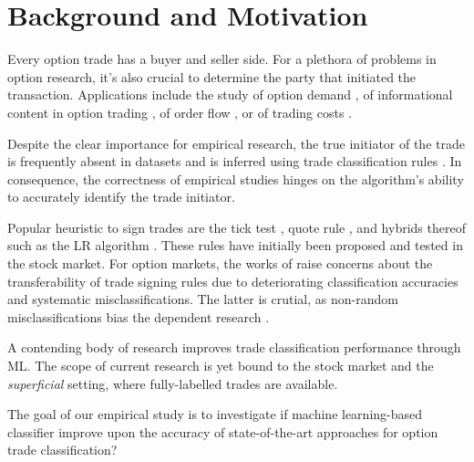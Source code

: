 

\section{Background and Motivation}

Every option trade has a buyer and seller side. For a plethora of problems in option research, it’s also crucial to determine the party that initiated the transaction. Applications include the study of option demand \autocite[][]{garleanuDemandBasedOptionPricing2009}, of informational content in option trading \autocites[][]{huDoesOptionTrading2014}[][]{panInformationOptionVolume2006}[][]{caoInformationalContentOption2005}, of order flow \autocite[][]{muravyevOrderFlowExpected2016}, or of trading costs \autocite[][]{muravyevOptionsTradingCosts2020}. 

Despite the clear importance for empirical research, the true initiator of the trade is frequently absent in datasets and is inferred using trade classification rules \autocite[][]{easleyOptionVolumeStock1998}. In consequence, the correctness of empirical studies hinges on the algorithm's ability to accurately identify the trade initiator.

Popular heuristic to sign trades are the tick test \autocite[][]{hasbrouckTradesQuotesInventories1988}, quote rule \autocite[][]{harrisDayEndTransactionPrice1989}, and hybrids thereof such as the \gls{LR} algorithm \autocite[][]{leeInferringTradeDirection1991}. These rules have initially been proposed and tested in the stock market. For option markets, the works of \textcites[][]{savickasInferringDirectionOption2003}[][]{grauerOptionTradeClassification2022} raise concerns about the transferability of trade signing rules due to deteriorating classification accuracies and systematic misclassifications. The latter is crutial, as non-random misclassifications bias the dependent research \autocites[][]{odders-whiteOccurrenceConsequencesInaccurate2000}[][]{theissenTestAccuracyLee2001}.

A contending body of research \autocites{blazejewskiLocalNonParametricModel2005}{rosenthalModelingTradeDirection2012}{ronenMachineLearningTrade2022} improves trade classification performance through \gls{ML}. The scope of current research is yet bound to the stock market and the \textit{superficial} setting, where fully-labelled trades are available. 

The goal of our empirical study is to investigate if machine learning-based classifier improve upon the accuracy of state-of-the-art approaches for option trade classification?

